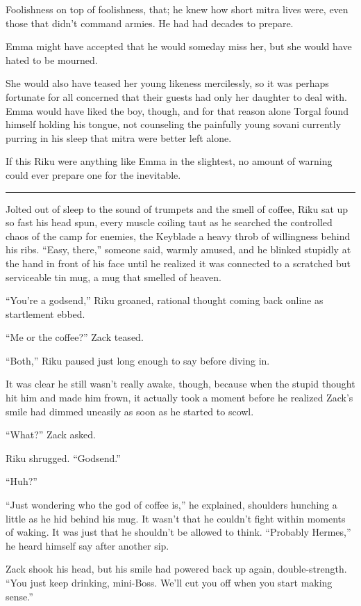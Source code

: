 Foolishness on top of foolishness, that; he knew how short mitra lives were, even those that didn't command armies. He had had decades to prepare.

Emma might have accepted that he would someday miss her, but she would have hated to be mourned.

She would also have teased her young likeness mercilessly, so it was perhaps fortunate for all concerned that their guests had only her daughter to deal with. Emma would have liked the boy, though, and for that reason alone Torgal found himself holding his tongue, not counseling the painfully young sovani currently purring in his sleep that mitra were better left alone.

If this Riku were anything like Emma in the slightest, no amount of warning could ever prepare one for the inevitable.

\fancybreak{\pfbreakdisplay}


Jolted out of sleep to the sound of trumpets and the smell of coffee, Riku sat up so fast his head spun, every muscle coiling taut as he searched the controlled chaos of the camp for enemies, the Keyblade a heavy throb of willingness behind his ribs. ``Easy, there,'' someone said, warmly amused, and he blinked stupidly at the hand in front of his face until he realized it was connected to a scratched but serviceable tin mug, a mug that smelled of heaven.

``You're a godsend,'' Riku groaned, rational thought coming back online as startlement ebbed.

``Me or the coffee?'' Zack teased.

``Both,'' Riku paused just long enough to say before diving in.

It was clear he still wasn't really awake, though, because when the stupid thought hit him and made him frown, it actually took a moment before he realized Zack's smile had dimmed uneasily as soon as he started to scowl.

``What?'' Zack asked.

Riku shrugged. ``Godsend.''

``Huh?''

``Just wondering who the god of coffee is,'' he explained, shoulders hunching a little as he hid behind his mug. It wasn't that he couldn't fight within moments of waking. It was just that he shouldn't be allowed to think. ``Probably Hermes,'' he heard himself say after another sip.

Zack shook his head, but his smile had powered back up again, double-strength. ``You just keep drinking, mini-Boss. We'll cut you off when you start making sense.''

